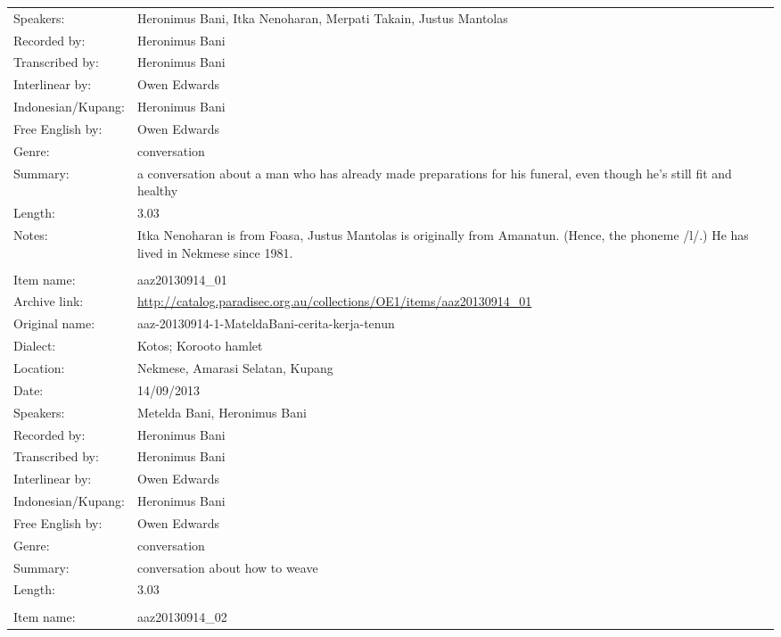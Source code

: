 \begin{longtable}{lL{.67\textwidth}}
Speakers:				& Heronimus Bani, Itka Nenoharan, Merpati Takain, Justus Mantolas\\
Recorded by:			& Heronimus Bani\\
Transcribed by:		& Heronimus Bani\\
Interlinear by:		& Owen Edwards \\
Indonesian/Kupang:		& Heronimus Bani\\
Free English by:		& Owen Edwards\\
Genre:				& conversation\\
Summary:				& a conversation about a man who has already made preparations for his funeral,
						even though he's still fit and healthy\\
Length:				& 3.03\\
Notes:				& Itka Nenoharan is from Fo{\Q}asa{\Q},
						Justus Mantolas is originally from Amanatun.
						(Hence, the phoneme /l/.)
						He has lived in Nekmese{\Q} since 1981.\\ \lspbottomrule
{}			& \\
Item name:			& aaz20130914{\_}01\\
Archive link:			& \url{http://catalog.paradisec.org.au/collections/OE1/items/aaz20130914_01}\\
Original name:			& aaz-20130914-1-MateldaBani-cerita-kerja-tenun\\
Dialect:				& Kotos; Koro{\Q}oto hamlet \\
Location:				& Nekmese{\Q}, Amarasi Selatan, Kupang \\
Date:				& 14/09/2013\\
Speakers:				& Metelda Bani, Heronimus Bani\\
Recorded by:			& Heronimus Bani\\
Transcribed by:		& Heronimus Bani\\
Interlinear by:		& Owen Edwards \\
Indonesian/Kupang:		& Heronimus Bani\\
Free English by:		& Owen Edwards\\
Genre:				& conversation\\
Summary:				& conversation about how to weave\\
Length:				& 3.03\\ \lspbottomrule
{}			& \\
Item name:			& aaz20130914{\_}02\\

\end{longtable}
